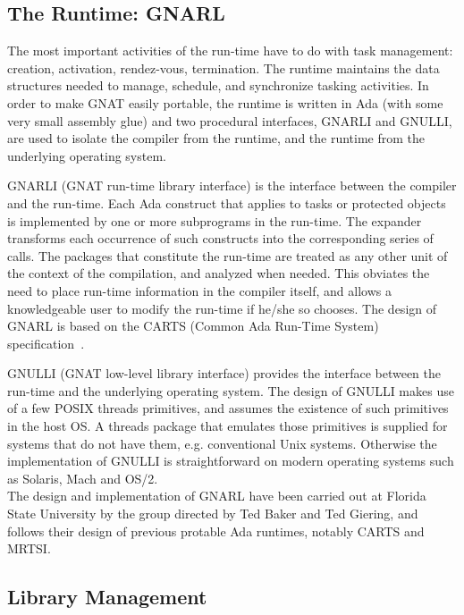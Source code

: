 \subsection{The Runtime: GNARL}


The most important activities of the run-time have to do with task
management: creation, activation, rendez-vous, termination. The runtime
maintains the data structures needed to manage, schedule, and synchronize
tasking activities. In order to make GNAT easily portable,  the runtime
is written in Ada (with some very small assembly glue) and two procedural
interfaces, GNARLI and GNULLI, are used to isolate 
the compiler from the runtime,  and the
runtime from the underlying operating system.

GNARLI (GNAT run-time library interface) is the interface between the
compiler and the run-time. Each Ada construct that applies to tasks or
protected objects is implemented by one or more subprograms in the
run-time. The expander transforms each occurrence of such constructs
into the corresponding series of calls. The packages that constitute
the run-time are treated as any other unit of the context of the
compilation, and analyzed when needed. This obviates the need to place
run-time information in the compiler itself, and allows a
knowledgeable user to modify the run-time if he/she so chooses. The
design of GNARL is based on the CARTS (Common Ada Run-Time System)
specification~\cite{gnarl}.

GNULLI (GNAT low-level library interface) provides the interface between
the run-time and the underlying operating system. The design of GNULLI
makes use of a few POSIX threads primitives, and assumes the existence of
such primitives in the host OS. A threads package that emulates those
primitives is supplied for systems that do not have them, e.g. conventional
Unix systems. Otherwise the implementation of GNULLI is straightforward
on modern operating systems such as  Solaris, Mach and OS/2.
\\
The design and implementation of GNARL have been carried out at Florida
State University by the group directed by Ted Baker and Ted
Giering, and follows their design of previous protable Ada runtimes, 
notably CARTS and MRTSI.

\subsection{Library Management}

